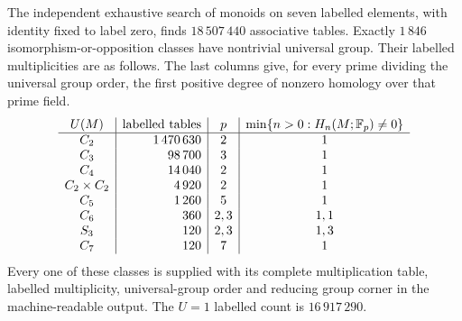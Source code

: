 \begin{theorem}\label{thm:A-seven-census}
The independent exhaustive search of monoids on seven labelled elements,
with identity fixed to label zero, finds $18\,507\,440$ associative tables.
Exactly $1\,846$ isomorphism-or-opposition classes have nontrivial universal
group. Their labelled multiplicities are as follows. The last columns give,
for every prime dividing the universal group order, the first positive degree
of nonzero homology over that prime field.
\[
\begin{array}{c|r|c|c}
 U(M)&\text{labelled tables}&p&\min\{n>0:H_n(M;\mathbb F_p)\ne0\}\\\hline
 C_2&1\,470\,630&2&1\\
 C_3&98\,700&3&1\\
 C_4&14\,040&2&1\\
 C_2\times C_2&4\,920&2&1\\
 C_5&1\,260&5&1\\
 C_6&360&2,3&1,1\\
 S_3&120&2,3&1,3\\
 C_7&120&7&1
\end{array}
\]
Every one of these classes is supplied with its complete multiplication table,
labelled multiplicity, universal-group order and reducing group corner in the
machine-readable output. The $U=1$ labelled count is $16\,917\,290$.
\end{theorem}
